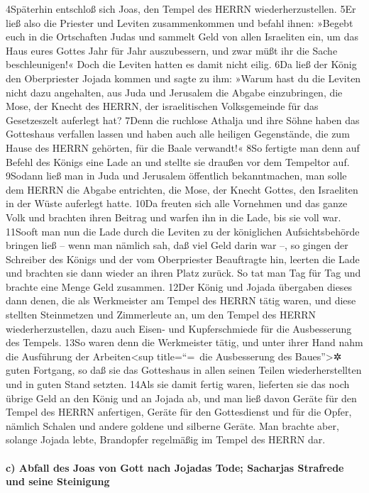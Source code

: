 4Späterhin entschloß sich Joas, den Tempel des HERRN wiederherzustellen.
5Er ließ also die Priester und Leviten zusammenkommen und befahl ihnen:
»Begebt euch in die Ortschaften Judas und sammelt Geld von allen
Israeliten ein, um das Haus eures Gottes Jahr für Jahr auszubessern, und
zwar müßt ihr die Sache beschleunigen!« Doch die Leviten hatten es damit
nicht eilig. 6Da ließ der König den Oberpriester Jojada kommen und sagte
zu ihm: »Warum hast du die Leviten nicht dazu angehalten, aus Juda und
Jerusalem die Abgabe einzubringen, die Mose, der Knecht des HERRN, der
israelitischen Volksgemeinde für das Gesetzeszelt auferlegt hat? 7Denn
die ruchlose Athalja und ihre Söhne haben das Gotteshaus verfallen
lassen und haben auch alle heiligen Gegenstände, die zum Hause des HERRN
gehörten, für die Baale verwandt!« 8So fertigte man denn auf Befehl des
Königs eine Lade an und stellte sie draußen vor dem Tempeltor auf.
9Sodann ließ man in Juda und Jerusalem öffentlich bekanntmachen, man
solle dem HERRN die Abgabe entrichten, die Mose, der Knecht Gottes, den
Israeliten in der Wüste auferlegt hatte. 10Da freuten sich alle
Vornehmen und das ganze Volk und brachten ihren Beitrag und warfen ihn
in die Lade, bis sie voll war. 11Sooft man nun die Lade durch die
Leviten zu der königlichen Aufsichtsbehörde bringen ließ -- wenn man
nämlich sah, daß viel Geld darin war --, so gingen der Schreiber des
Königs und der vom Oberpriester Beauftragte hin, leerten die Lade und
brachten sie dann wieder an ihren Platz zurück. So tat man Tag für Tag
und brachte eine Menge Geld zusammen. 12Der König und Jojada übergaben
dieses dann denen, die als Werkmeister am Tempel des HERRN tätig waren,
und diese stellten Steinmetzen und Zimmerleute an, um den Tempel des
HERRN wiederherzustellen, dazu auch Eisen- und Kupferschmiede für die
Ausbesserung des Tempels. 13So waren denn die Werkmeister tätig, und
unter ihrer Hand nahm die Ausführung der Arbeiten\textless sup
title=``=~die Ausbesserung des Baues''\textgreater✲ guten Fortgang, so
daß sie das Gotteshaus in allen seinen Teilen wiederherstellten und in
guten Stand setzten. 14Als sie damit fertig waren, lieferten sie das
noch übrige Geld an den König und an Jojada ab, und man ließ davon
Geräte für den Tempel des HERRN anfertigen, Geräte für den Gottesdienst
und für die Opfer, nämlich Schalen und andere goldene und silberne
Geräte. Man brachte aber, solange Jojada lebte, Brandopfer regelmäßig im
Tempel des HERRN dar.

\hypertarget{c-abfall-des-joas-von-gott-nach-jojadas-tode-sacharjas-strafrede-und-seine-steinigung}{%
\paragraph{c) Abfall des Joas von Gott nach Jojadas Tode; Sacharjas
Strafrede und seine
Steinigung}\label{c-abfall-des-joas-von-gott-nach-jojadas-tode-sacharjas-strafrede-und-seine-steinigung}}

